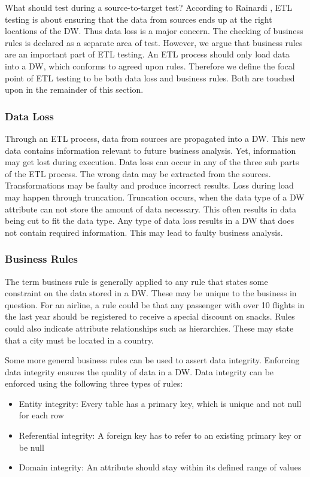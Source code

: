What should \FW{} test during a source-to-target test? According to Rainardi \cite{rainardi2007building}, ETL testing is about ensuring that the data from sources ends up at the right locations of the DW. Thus data loss is a major concern. The checking of business rules is declared as a separate area of test. However, we argue that business rules are an important part of ETL testing. An ETL process should only load data into a DW, which conforms to agreed upon rules. Therefore we define the focal point of ETL testing to be both data loss and business rules. Both are touched upon in the remainder of this section.

\subsubsection{Data Loss}
Through an ETL process, data from sources are propagated into a DW. This new data contains information relevant to future business analysis. Yet, information may get lost during execution. Data loss can occur in any of the three sub parts of the ETL process. The wrong data may be extracted from the sources. Transformations may be faulty and produce incorrect results. Loss during load may happen through truncation. Truncation occurs, when the data type of a DW attribute can not store the amount of data necessary. This often results in data being cut to fit the data type. Any type of data loss results in a DW that does not contain required information. This may lead to faulty business analysis.

\subsubsection{Business Rules}
The term business rule is generally applied to any rule that states some constraint on the data stored in a DW. These may be unique to the business in question. For an airline, a rule could be that any passenger with over 10 flights in the last year should be registered to receive a special discount on snacks. Rules could also indicate attribute relationships such as hierarchies. These may state that a city must be located in a country.

Some more general business rules can be used to assert data integrity. Enforcing data integrity ensures the quality of data in a DW. Data integrity can be enforced using the following three types of rules:

\begin{itemize}
\item Entity integrity: Every table has a primary key, which is unique and not null for each row
\item Referential integrity: A foreign key has to refer to an existing primary key or be null
\item Domain integrity: An attribute should stay within its defined range of values
\end{itemize}

